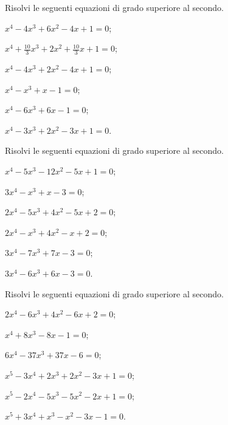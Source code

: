 \begin{esercizio}[\Ast]
 \label{ese:5.55}
Risolvi le seguenti equazioni di grado superiore al secondo.
\begin{multicols}{2}
\begin{enumeratea}
\item $x^4-4x^3+6x^2-4x+1=0$;
\item $x^4+\frac{10} 3x^3+2x^2+\frac{10} 3x+1=0$;
\item $x^4-4x^3+2x^2-4x+1=0$;
\item $x^4-x^3+x-1=0$;
\item $x^4-6x^3+6x-1=0$;
\item $x^4-3x^3+2x^2-3x+1=0$.
\end{enumeratea}
\end{multicols}
\end{esercizio}

\begin{esercizio}[\Ast]
 \label{ese:5.56}
Risolvi le seguenti equazioni di grado superiore al secondo.
\begin{multicols}{2}
\begin{enumeratea}
\item $x^4-5x^3-12x^2-5x+1=0$;
\item $3x^4-x^3+x-3=0$;
\item $2x^4-5x^3+4x^2-5x+2=0$;
\item $2x^4-x^3+4x^2-x+2=0$;
\item $3x^4-7x^3+7x-3=0$;
\item $3x^4-6x^3+6x-3=0$.
\end{enumeratea}
\end{multicols}
\end{esercizio}

\begin{esercizio}[\Ast]
 \label{ese:5.57}
Risolvi le seguenti equazioni di grado superiore al secondo.
\begin{multicols}{2}
\begin{enumeratea}
\item $2x^4-6x^3+4x^2-6x+2=0$;
\item $x^4+8x^3-8x-1=0$;
\item $6x^4-37x^3+37x-6=0$;
\item $x^5-3x^4+2x^3+2x^2-3x+1=0$;
\item $x^5-2x^4-5x^3-5x^2-2x+1=0$;
\item $x^5+3x^4+x^3-x^2-3x-1=0$.
\end{enumeratea}
\end{multicols}
\end{esercizio}

